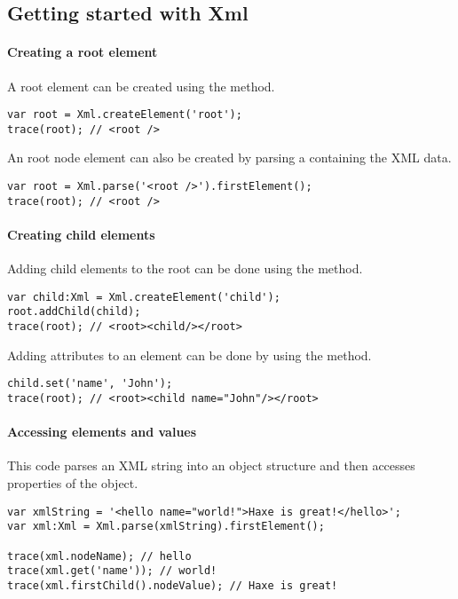 \subsection{Getting started with Xml}
\label{std-Xml-getting-started}

\paragraph{Creating a root element}

A  root element can be created using the  method.
\begin{lstlisting}
var root = Xml.createElement('root');
trace(root); // <root />
\end{lstlisting}

An root node element can also be created by parsing a  containing the XML data.
\begin{lstlisting}
var root = Xml.parse('<root />').firstElement();
trace(root); // <root />
\end{lstlisting}

\paragraph{Creating child elements}

Adding child elements to the root can be done using the  method.
\begin{lstlisting}
var child:Xml = Xml.createElement('child'); 
root.addChild(child);
trace(root); // <root><child/></root>
\end{lstlisting}


Adding attributes to an element can be done by using the  method.
\begin{lstlisting}
child.set('name', 'John');
trace(root); // <root><child name="John"/></root>
\end{lstlisting}

\paragraph{Accessing elements and values}

This code parses an XML string into an object structure  and then accesses properties of the object.
\begin{lstlisting}
var xmlString = '<hello name="world!">Haxe is great!</hello>';
var xml:Xml = Xml.parse(xmlString).firstElement();
	
trace(xml.nodeName); // hello
trace(xml.get('name')); // world!
trace(xml.firstChild().nodeValue); // Haxe is great!
\end{lstlisting}

